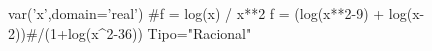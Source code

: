 \begin{sagesilent}
var('x',domain='real')
#f = log(x) / x**2
f = (log(x**2-9) + log(x-2))#/(1+log(x^2-36))
Tipo="Racional"
\end{sagesilent}
